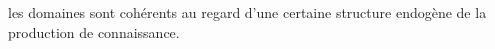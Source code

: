 {les domaines sont cohérents au regard d'une certaine structure endogène de la production de connaissance.
}



